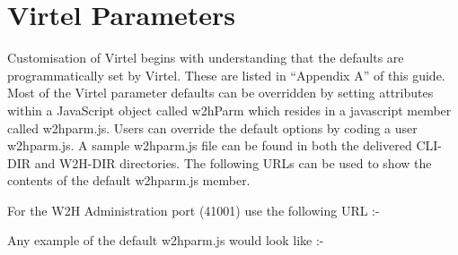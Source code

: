 \documentclass[letterpaper,10pt,english]{sphinxmanual}
\begin{document}
\section{Virtel Parameters}
\label{\detokenize{TN202002:virtel-parameters}}
Customisation of Virtel begins with understanding that the defaults are programmatically set by Virtel. These are listed in “Appendix A” of this guide. Most of the Virtel parameter defaults can be overridden by setting attributes within a JavaScript object called w2hParm which resides in a javascript member called w2hparm.js. Users can override the default options by coding a user w2hparm.js. A sample w2hparm.js file can be found in both the delivered CLI-DIR and W2H-DIR directories. The following URLs can be used to show the contents of the default w2hparm.js member.

For the W2H Administration port (41001) use the following URL  :-

\begin{sphinxVerbatim}[commandchars=\\\{\}]
\end{sphinxVerbatim}

Any example of the default w2hparm.js would look like :-
\end{document}
